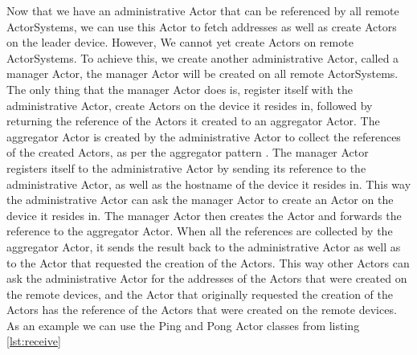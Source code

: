 \documentclass[a4paper]{article}
\begin{document}
Now that we have an administrative Actor that can be referenced by all remote ActorSystems, we can use this Actor to fetch addresses as well as create Actors on the leader device. However, We cannot yet create Actors on remote ActorSystems. To achieve this, we create another administrative Actor, called a manager Actor, the manager Actor will be created on all remote ActorSystems. The only thing that the manager Actor does is, register itself with the administrative Actor, create Actors on the device it resides in, followed by returning the reference of the Actors it created to an aggregator Actor. The aggregator Actor is created by the administrative Actor to collect the references of the created Actors, as per the aggregator pattern \cite{aggregatorpattern}. The manager Actor registers itself to the administrative Actor by sending its reference to the administrative Actor, as well as the hostname of the device it resides in. This way the administrative Actor can ask the manager Actor to create an Actor on the device it resides in. The manager Actor then creates the Actor and forwards the reference to the aggregator Actor. When all the references are collected by the aggregator Actor, it sends the result back to the administrative Actor as well as to the Actor that requested the creation of the Actors. This way other Actors can ask the administrative Actor for the addresses of the Actors that were created on the remote devices, and the Actor that originally requested the creation of the Actors has the reference of the Actors that were created on the remote devices. As an example we can use the Ping and Pong Actor classes from listing \ref{lst:receive}
\end{document}
